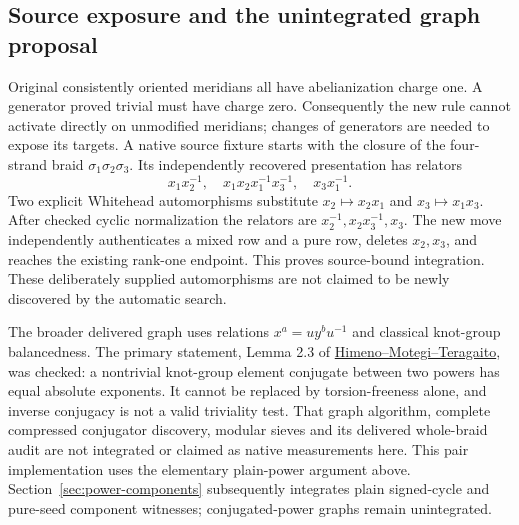 \subsection{Source exposure and the unintegrated graph proposal}

Original consistently oriented meridians all have abelianization charge one.
A generator proved trivial must have charge zero. Consequently the new rule
cannot activate directly on unmodified meridians; changes of generators are
needed to expose its targets. A native source fixture starts with the closure
of the four-strand braid $\sigma_1\sigma_2\sigma_3$. Its independently recovered
presentation has relators
\[
 x_1x_2^{-1},\quad x_1x_2x_1^{-1}x_3^{-1},\quad x_3x_1^{-1}.
\]
Two explicit Whitehead automorphisms substitute $x_2\mapsto x_2x_1$ and
$x_3\mapsto x_1x_3$. After checked cyclic normalization the relators are
$x_2^{-1},x_2x_3^{-1},x_3$. The new move independently authenticates a mixed
row and a pure row, deletes $x_2,x_3$, and reaches the existing rank-one
endpoint. This proves source-bound integration. These deliberately supplied
automorphisms are not claimed to be newly discovered by the automatic search.

The broader delivered graph uses relations $x^a=u y^b u^{-1}$ and classical
knot-group balancedness. The primary statement, Lemma 2.3 of
\href{https://arxiv.org/abs/2208.00621}{Himeno--Motegi--Teragaito}, was checked:
a nontrivial knot-group element conjugate between two powers has equal
absolute exponents. It cannot be replaced by torsion-freeness alone, and
inverse conjugacy is not a valid triviality test. That graph algorithm,
complete compressed conjugator discovery, modular sieves and its delivered
whole-braid audit are not integrated or claimed as native measurements here.
This pair implementation uses the elementary plain-power argument above.
Section~\ref{sec:power-components} subsequently integrates plain signed-cycle
and pure-seed component witnesses; conjugated-power graphs remain unintegrated.


